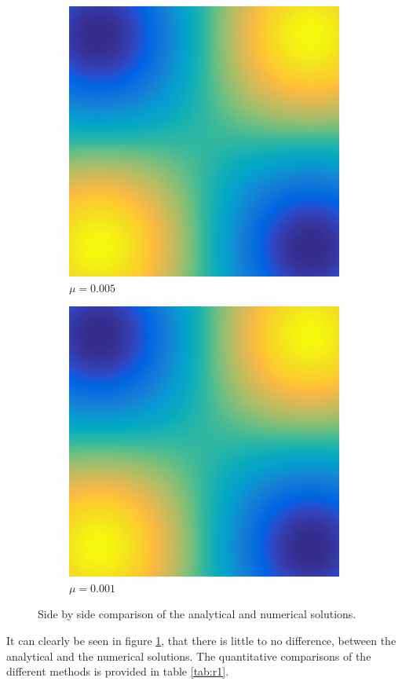 \documentclass[../fem.tex]{subfile}
\begin{document}
\begin{figure}[htpb]
\begin{subfigure}{0.4\textwidth}
    \includegraphics[width=0.8\linewidth]{figures/r1c/approx.png}
    \caption{$\mu=0.005$}
  \end{subfigure}
  \begin{subfigure}{0.4\textwidth}
    \centering
    \includegraphics[width=0.8\linewidth]{figures/r1d/approx.png}
    \caption{$\mu=0.001$}
  \end{subfigure}
  \caption{Side by side comparison of the analytical and numerical solutions.}
  \label{fig:r1_soln}
\end{figure}

It can clearly be seen in figure \ref{fig:r1_soln}, that there is little to no
difference, between the analytical and the numerical solutions. The
quantitative comparisons of the different methods is provided in table
\ref{tab:r1}.
\end{document}
